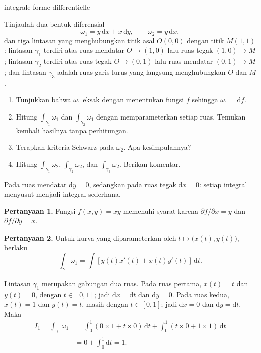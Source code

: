 
\begin{exo}{integrale-forme-differentielle}

Tinjaulah dua bentuk diferensial
\[
\omega_1 = y\,\mathrm{d}x + x\,\mathrm{d}y,
\qquad
\omega_2 = y\,\mathrm{d}x,
\]
dan tiga lintasan yang menghubungkan titik asal $O(0,0)$ dengan titik $M(1,1)$:
lintasan $\gamma_1$ terdiri atas ruas mendatar $O\to(1,0)$ lalu ruas tegak
$(1,0)\to M$; lintasan $\gamma_2$ terdiri atas ruas tegak $O\to(0,1)$ lalu
ruas mendatar $(0,1)\to M$; dan lintasan $\gamma_3$ adalah ruas garis lurus
yang langsung menghubungkan $O$ dan $M$.

\begin{enumerate}
\item Tunjukkan bahwa $\omega_1$ eksak dengan menentukan fungsi $f$ sehingga $\omega_1=\mathrm{d}f$.
\item Hitung $\int_{\gamma_1}\omega_1$ dan $\int_{\gamma_2}\omega_1$ dengan memparameterkan setiap ruas. Temukan kembali hasilnya tanpa perhitungan.
\item Terapkan kriteria Schwarz pada $\omega_2$. Apa kesimpulannya?
\item Hitung $\int_{\gamma_1}\omega_2$, $\int_{\gamma_2}\omega_2$, dan $\int_{\gamma_3}\omega_2$. Berikan komentar.
\end{enumerate}

\begin{indication}
Pada ruas mendatar $\mathrm{d}y=0$, sedangkan pada ruas tegak
$\mathrm{d}x=0$: setiap integral menyusut menjadi integral sederhana.
\end{indication}

\begin{solution}
\textbf{Pertanyaan 1.} Fungsi $f(x,y)=xy$ memenuhi syarat karena $\partial f/\partial x=y$ dan $\partial f/\partial y=x$.

\textbf{Pertanyaan 2.} Untuk kurva yang diparameterkan oleh
$t\mapsto\bigl(x(t),y(t)\bigr)$, berlaku
\[
\int_\gamma\omega_1
= \int \left[y(t)x'(t)+x(t)y'(t)\right]\,\mathrm{d}t.
\]

Lintasan $\gamma_1$ merupakan gabungan dua ruas. Pada ruas pertama,
$x(t)=t$ dan $y(t)=0$, dengan $t\in[0,1]$; jadi $\mathrm{d}x=\mathrm{d}t$
dan $\mathrm{d}y=0$. Pada ruas kedua, $x(t)=1$ dan $y(t)=t$, masih dengan
$t\in[0,1]$; jadi $\mathrm{d}x=0$ dan $\mathrm{d}y=\mathrm{d}t$. Maka
\[
\begin{aligned}
I_1
= \int_{\gamma_1}\omega_1
&= \int_0^1\left(0\times 1+t\times 0\right)\,\mathrm{d}t
 + \int_0^1\left(t\times 0+1\times 1\right)\,\mathrm{d}t \\
&= 0+\int_0^1\mathrm{d}t = 1.
\end{aligned}
\]


\end{solution}
\end{exo}
